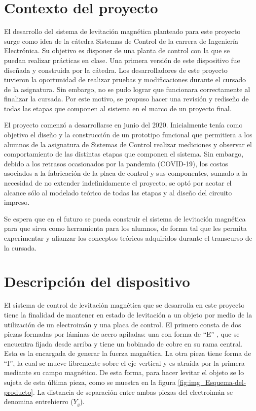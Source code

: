 \section{Contexto del proyecto}

El desarrollo del sistema de levitación magnética planteado para este proyecto surge como idea de la cátedra Sistemas de Control de la carrera de Ingeniería Electrónica. Su objetivo es disponer de una planta de control con la  que se puedan realizar prácticas en clase. Una primera versión de este dispositivo fue diseñada y construida por la cátedra. Los desarrolladores de este proyecto tuvieron la oportunidad de realizar pruebas y modificaciones durante el cursado de la asignatura. Sin embargo, no se pudo lograr que funcionara correctamente al finalizar la cursada. Por este motivo, se propuso hacer una revisión y rediseño de todas las etapas que componen al sistema en el marco de un proyecto final.

El proyecto comenzó a desarrollarse en junio del 2020. Inicialmente tenía como objetivo el diseño y la construcción de un prototipo funcional que permitiera a los alumnos de la asignatura de Sistemas de Control realizar mediciones y observar el comportamiento de las distintas etapas que componen el sistema. Sin embargo, debido a los retrasos ocasionados por la pandemia (COVID-19), los costos asociados a la fabricación de la placa de control y sus componentes, sumado a la  necesidad de no extender indefinidamente el proyecto, se optó por acotar el alcance sólo al modelado teórico de todas las etapas y al diseño del circuito impreso.

Se espera que en el futuro se pueda construir el sistema de levitación magnética para que sirva como herramienta para los alumnos, de forma tal que les permita experimentar y afianzar los conceptos teóricos adquiridos durante el transcurso de la cursada.


\section{Descripción del dispositivo}
El sistema de control de levitación magnética que se desarrolla en este proyecto tiene la finalidad de mantener en estado de levitación a un objeto por medio de la utilización de un electroimán y una placa de control. El primero consta de dos piezas formadas por láminas de acero apiladas: una con forma de “E” , que se encuentra fijada desde arriba y tiene un bobinado de cobre en su rama central. Esta es la encargada de generar la fuerza magnética. La otra pieza tiene forma de “I”, la cual se mueve libremente sobre el eje vertical y es atraída por la primera mediante su campo magnético. De esta forma, para hacer levitar el objeto se lo sujeta de esta última pieza, como se muestra en la figura \ref{fig:img_Esquema-del-producto}. La distancia de separación entre ambas piezas del electroimán se denomina entrehierro ($Y_{g}$).

